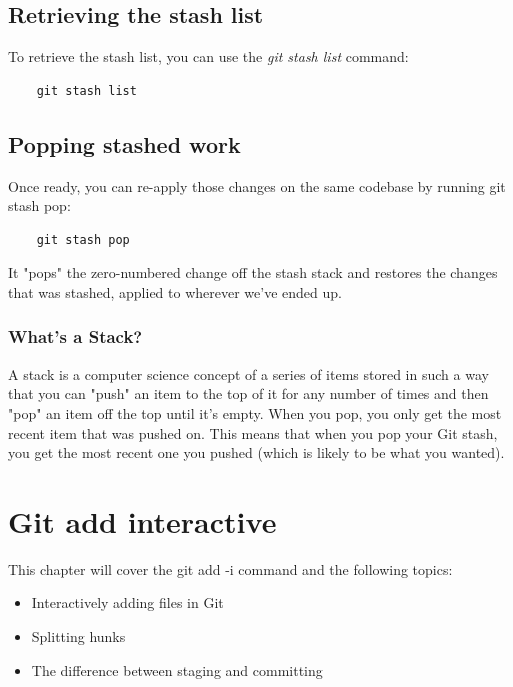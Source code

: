 \documentclass{report}
\begin{document}
\section{Retrieving the stash list}

To retrieve the stash list, you can use the \textit{git stash list} command:

\begin{lstlisting}
    git stash list
\end{lstlisting}

\section{Popping stashed work}

Once ready, you can re-apply those changes on the same codebase by running git stash pop:

\begin{lstlisting}
    git stash pop
\end{lstlisting}

It "pops" the zero-numbered change off the stash stack and restores the changes that was stashed, applied to wherever we've ended up.

\subsection{What's a Stack?}
A stack is a computer science concept of a series of items stored in such a way that you can "push" an item to the top of it for any number of times and then "pop" an item off the top until it's empty. When you pop, you only get the most recent item that was pushed on. This means that when you pop your Git stash, you get the most recent one you pushed (which is likely to be what you wanted).

\chapter{Git add interactive}

This chapter will cover the git add -i command and the following topics:

\begin{itemize}
    \item Interactively adding files in Git
    \item Splitting hunks
    \item The difference between staging and committing
\end{itemize}
\end{document}
